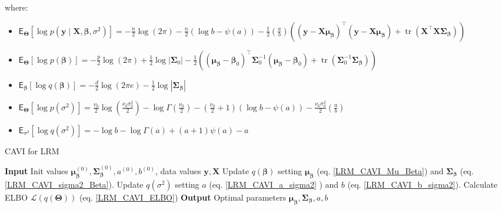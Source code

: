 \begin{itemize}
\newpage

where:

\begin{itemize}
    \item $\mathsf{E}_{\bm{\Theta}}\left[\log p(\bm{y} \mid \bm{X}, \bm{\beta}, \sigma^2)\right]=-\frac{n}{2}\log(2\pi) - \frac{n}{2}\left(\log b -\psi(a)\right)
- \frac{1}{2}\left(\frac{a}{b}\right)\left((\bm{y} - \bm{X}  \bm\mu_{\bm{\beta}})^{\top}
(\bm{y} - \bm{X} \bm\mu_{\bm{\beta}}) + \operatorname{tr}\left(\bm{X}^{\top}\bm{X}\bm{\Sigma}_{\bm{\beta}}\right)\right)$
\item  $\mathsf{E}_{\bm{\Theta}}\left[\log  p(\bm{\beta})\right]=- \frac{p}{2}\log(2\pi) + \frac{1}{2}\log|\bm\Sigma_{0}|
- \frac{1}{2}
\left((\bm\mu_{\bm\beta}-\bm\beta_{0})^{\top}
\bm\Sigma_{0}^{-1}(\bm\mu_{\bm\beta}-\bm\beta_{0})+\operatorname{tr}(\bm\Sigma_0^{-1}\bm\Sigma_{\bm{\beta}})\right)$
\item $\mathsf{E}_{\bm{\beta}}\left[\log q(\bm{\beta})\right]=-\frac{d}{2}\log(2\pi e)-\frac{1}{2}\log|\bm{\Sigma}_{\bm{\beta}}|$
\item$\mathsf{E}_{\bm{\Theta}}\left[\log p(\sigma^2 )\right]=\frac{\nu_{0}}{2}\log \left(\frac{\nu_0\sigma_{0}^2}{2}\right) - \log\Gamma\left(\frac{\nu_{0}}{2}\right)
- \left(\frac{\nu_{0}}{2}+1\right)\left(\log b -\psi(a)\right)
- \frac{\nu_0\sigma_{0}^2}{2}\left(\frac{a}{b}\right)$
\item$\mathsf{E}_{\sigma^2}\left[\log q(\sigma^2)\right]=-\log b-\log\Gamma(a)+(a+1)\psi(a)-a$
\end{itemize}

\end{itemize}

\begin{algorithm}[H]
\caption{CAVI for LRM}
\begin{algorithmic}
\State \textbf{Input} Init values $\bm{\mu}_{\bm{\beta}}^{(0)}, \bm{\Sigma}_{\bm{\beta}}^{(0)}, a^{(0)}, b^{(0)}$, data values $\bm{y},\bm{X}$
\State Update $q(\bm{\beta})$ setting $\bm{\mu}_{\bm{\beta}}$ (eq. \ref{LRM_CAVI_Mu_Beta}) and $\bm{\Sigma}_{\bm{\beta}}$ (eq. \ref{LRM_CAVI_sigma2_Beta}).
\State Update $q(\sigma^2)$ setting $a$ (eq. \ref{LRM_CAVI_a_sigma2} ) and $b$ (eq. \ref{LRM_CAVI_b_sigma2}).
\State Calculate ELBO $\mathcal{L}(q(\bm{\Theta}))$ (eq. \ref{LRM_CAVI_ELBO})
\EndWhile
\State \textbf{Output} Optimal parameters $\bm{\mu}_{\bm{\beta}}, \bm{\Sigma}_{\bm{\beta}}, a, b$
\end{algorithmic}
\end{algorithm}


